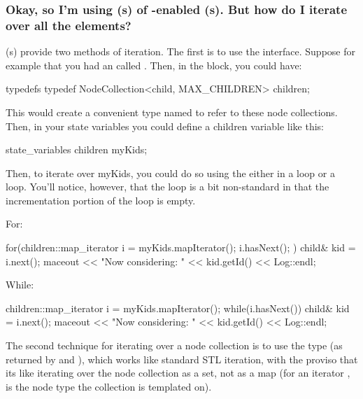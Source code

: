 \subsubsection*{Okay, so I'm using (s) of -enabled
(s).  But how do I iterate over all the elements?}

(s) provide two methods of iteration. The first is to use the 
 interface.  Suppose for example that you had an  called
.  Then, in the  block, you could have:

\begin{programlisting}
typedefs {
  typedef NodeCollection<child, MAX_CHILDREN> children;
}
\end{programlisting}
This would create a convenient type named  to
refer to these node collections.  Then, in your state variables you
could define a children variable like this:

\begin{programlisting}
state_variables {
  children myKids;
}
\end{programlisting}

Then, to iterate over myKids, you could do so using the
 either in a  loop or a
 loop.  You'll notice, however, that the
 loop is a bit non-standard in that the incrementation
portion of the loop is empty.

For:

\begin{programlisting}
for(children::map_iterator i = myKids.mapIterator(); i.hasNext(); )
{
  child& kid = i.next();
  maceout << "Now considering: " << kid.getId() << Log::endl;
}
\end{programlisting}

While:

\begin{programlisting}
children::map_iterator i = myKids.mapIterator();
while(i.hasNext()) 
{
  child& kid = i.next();
  maceout << "Now considering: " << kid.getId() << Log::endl;
}
\end{programlisting}

The second technique for iterating over a node collection is to use the
 type (as returned by  and
), which works like standard STL iteration, with the proviso
that its like iterating over the node collection as a set, not as a map (for an
iterator ,  is the node type the collection is
templated on).

